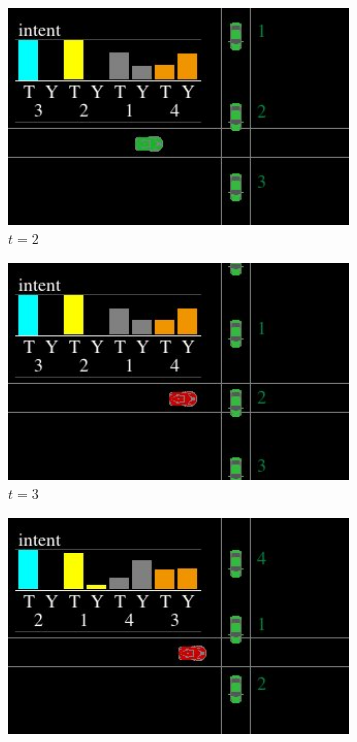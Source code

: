 \begin{figure}[!t]
\begin{subfigure}[b]{0.24\textwidth}
         \centering
         \includegraphics[width=0.99\textwidth]{figures/intent_distribution/screenshot_4.jpeg}
         \caption{$t=2$}
     \end{subfigure}
     \begin{subfigure}[b]{0.24\textwidth}
         \centering
         \includegraphics[width=0.99\textwidth]{figures/intent_distribution/screenshot_5.jpeg}
         \caption{$t=3$}
     \end{subfigure}
     \hfill
     \begin{subfigure}[b]{0.24\textwidth}
         \centering
         \includegraphics[width=0.99\textwidth]{figures/intent_distribution/screenshot_6.jpeg}

\end{subfigure}
\end{figure}
